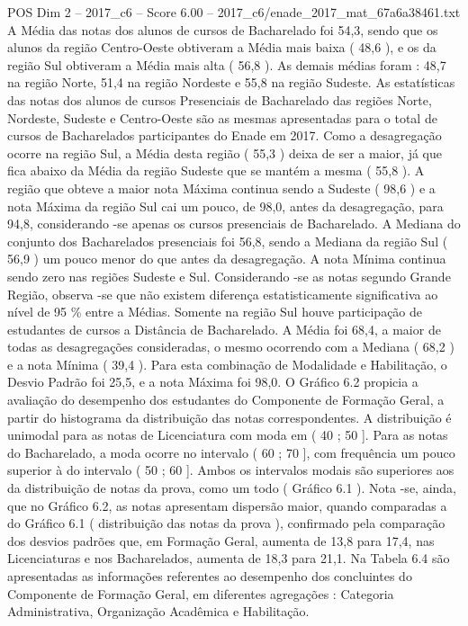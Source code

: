 \begin{textsample}{POS Dim 2 – 2017\_c6 – Score 6.00 – 2017\_c6/enade\_2017\_mat\_67a6a38461.txt}
A Média das notas dos alunos de cursos de Bacharelado foi 54,3, sendo que os alunos da região Centro-Oeste obtiveram a Média mais baixa ( 48,6 ), e os da região Sul obtiveram a Média mais alta ( 56,8 ).
As demais médias foram : 48,7 na região Norte, 51,4 na região Nordeste e 55,8 na região Sudeste.
As estatísticas das notas dos alunos de cursos Presenciais de Bacharelado das regiões Norte, Nordeste, Sudeste e Centro-Oeste são as mesmas apresentadas para o total de cursos de Bacharelados participantes do Enade em 2017.
Como a desagregação ocorre na região Sul, a Média desta região ( 55,3 ) deixa de ser a maior, já que fica abaixo da Média da região Sudeste que se mantém a mesma ( 55,8 ).
A região que obteve a maior nota Máxima continua sendo a Sudeste ( 98,6 ) e a nota Máxima da região Sul cai um pouco, de 98,0, antes da desagregação, para 94,8, considerando -se apenas os cursos presenciais de Bacharelado.
A Mediana do conjunto dos Bacharelados presenciais foi 56,8, sendo a Mediana da região Sul ( 56,9 ) um pouco menor do que antes da desagregação.
A nota Mínima continua sendo zero nas regiões Sudeste e Sul.
Considerando -se as notas segundo Grande Região, observa -se que não existem diferença estatisticamente significativa ao nível de 95 \% entre a Médias.
Somente na região Sul houve participação de estudantes de cursos a Distância de Bacharelado.
A Média foi 68,4, a maior de todas as desagregações consideradas, o mesmo ocorrendo com a Mediana ( 68,2 ) e a nota Mínima ( 39,4 ).
Para esta combinação de Modalidade e Habilitação, o Desvio Padrão foi 25,5, e a nota Máxima foi 98,0.
O Gráfico 6.2 propicia a avaliação do desempenho dos estudantes do Componente de Formação Geral, a partir do histograma da distribuição das notas correspondentes.
A distribuição é unimodal para as notas de Licenciatura com moda em ( 40 ; 50 ].
Para as notas do Bacharelado, a moda ocorre no intervalo ( 60 ; 70 ], com frequência um pouco superior à do intervalo ( 50 ; 60 ].
Ambos os intervalos modais são superiores aos da distribuição de notas da prova, como um todo ( Gráfico 6.1 ).
Nota -se, ainda, que no Gráfico 6.2, as notas apresentam dispersão maior, quando comparadas a do Gráfico 6.1 ( distribuição das notas da prova ), confirmado pela comparação dos desvios padrões que, em Formação Geral, aumenta de 13,8 para 17,4, nas Licenciaturas e nos Bacharelados, aumenta de 18,3 para 21,1.
Na Tabela 6.4 são apresentadas as informações referentes ao desempenho dos concluintes do Componente de Formação Geral, em diferentes agregações : Categoria Administrativa, Organização Acadêmica e Habilitação.

\end{textsample}
